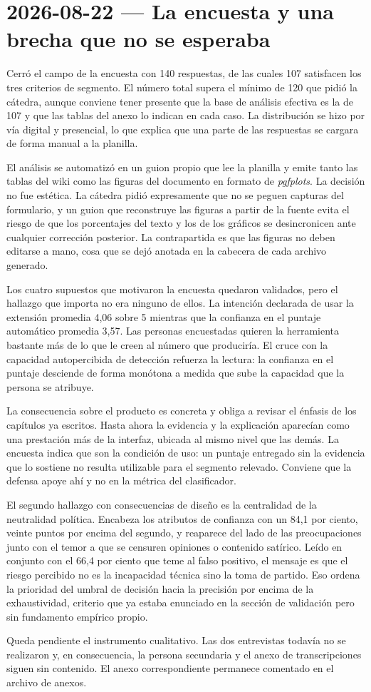 \section{2026-08-22 — La encuesta y una brecha que no se esperaba}

Cerró el campo de la encuesta con 140 respuestas, de las cuales 107 satisfacen los tres criterios de segmento. El número total supera el mínimo de 120 que pidió la cátedra, aunque conviene tener presente que la base de análisis efectiva es la de 107 y que las tablas del anexo lo indican en cada caso. La distribución se hizo por vía digital y presencial, lo que explica que una parte de las respuestas se cargara de forma manual a la planilla.

El análisis se automatizó en un guion propio que lee la planilla y emite tanto las tablas del wiki como las figuras del documento en formato de \emph{pgfplots}. La decisión no fue estética. La cátedra pidió expresamente que no se peguen capturas del formulario, y un guion que reconstruye las figuras a partir de la fuente evita el riesgo de que los porcentajes del texto y los de los gráficos se desincronicen ante cualquier corrección posterior. La contrapartida es que las figuras no deben editarse a mano, cosa que se dejó anotada en la cabecera de cada archivo generado.

Los cuatro supuestos que motivaron la encuesta quedaron validados, pero el hallazgo que importa no era ninguno de ellos. La intención declarada de usar la extensión promedia 4,06 sobre 5 mientras que la confianza en el puntaje automático promedia 3,57. Las personas encuestadas quieren la herramienta bastante más de lo que le creen al número que produciría. El cruce con la capacidad autopercibida de detección refuerza la lectura: la confianza en el puntaje desciende de forma monótona a medida que sube la capacidad que la persona se atribuye.

La consecuencia sobre el producto es concreta y obliga a revisar el énfasis de los capítulos ya escritos. Hasta ahora la evidencia y la explicación aparecían como una prestación más de la interfaz, ubicada al mismo nivel que las demás. La encuesta indica que son la condición de uso: un puntaje entregado sin la evidencia que lo sostiene no resulta utilizable para el segmento relevado. Conviene que la defensa apoye ahí y no en la métrica del clasificador.

El segundo hallazgo con consecuencias de diseño es la centralidad de la neutralidad política. Encabeza los atributos de confianza con un 84,1 por ciento, veinte puntos por encima del segundo, y reaparece del lado de las preocupaciones junto con el temor a que se censuren opiniones o contenido satírico. Leído en conjunto con el 66,4 por ciento que teme al falso positivo, el mensaje es que el riesgo percibido no es la incapacidad técnica sino la toma de partido. Eso ordena la prioridad del umbral de decisión hacia la precisión por encima de la exhaustividad, criterio que ya estaba enunciado en la sección de validación pero sin fundamento empírico propio.

Queda pendiente el instrumento cualitativo. Las dos entrevistas todavía no se realizaron y, en consecuencia, la persona secundaria y el anexo de transcripciones siguen sin contenido. El anexo correspondiente permanece comentado en el archivo de anexos.

\bigskip
